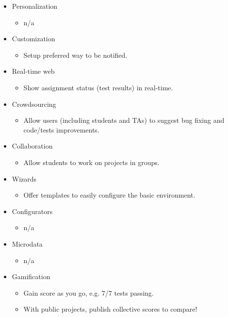 \begin{itemize}
  \item Personalization
  \begin{itemize}
    \item n/a
  \end{itemize}
  \item Customization
  \begin{itemize}
    \item Setup preferred way to be notified.
  \end{itemize}
  \item Real-time web
  \begin{itemize}
    \item Show assignment status (test results) in real-time.
  \end{itemize}
  \item Crowdsourcing
  \begin{itemize}
    \item Allow users (including students and TAs) to suggest bug fixing and code/tests improvements.
  \end{itemize}
  \item Collaboration
  \begin{itemize}
    \item Allow students to work on projects in groups.
  \end{itemize}
  \item Wizards
  \begin{itemize}
    \item Offer templates to easily configure the basic environment.
  \end{itemize}
  \item Configurators
  \begin{itemize}
    \item n/a
  \end{itemize}
  \item Microdata
  \begin{itemize}
    \item n/a
  \end{itemize}
  \item Gamification
  \begin{itemize}
    \item Gain score as you go, e.g. 7/7 tests passing.
    \item With public projects, publish collective scores to compare!
  \end{itemize}
\end{itemize}

